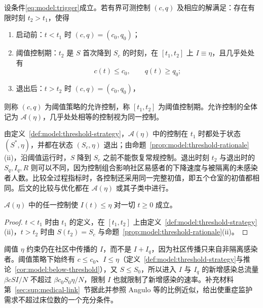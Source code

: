 \begin{definition}[阈值策略]
\label{def:model:threshold-strategy}
设条件\eqref{eq:model:trigger}成立。若有界可测控制 $(c,q)$ 及相应的解满足：存在有限时刻 $t_2>t_1$，使得
\begin{enumerate}
\renewcommand{\labelenumi}{(\roman{enumi})}
\item 启动前：$t<t_1$ 时 $(c,q)=(c_0,q_0)$；
\item 阈值控制期：$t_2$ 是 $S$ 首次降到 $S_c$ 的时刻，在 $[t_1,t_2]$ 上 $I\equiv\eta$，且几乎处处有
\begin{equation}
c(t)\le c_0,\qquad q(t)\ge q_0;
\label{eq:model:plateau-requirement}
\end{equation}
\item 退出后：$t>t_2$ 时 $(c,q)=(c_0,q_0)$，
\end{enumerate}
则称 $(c,q)$ 为阈值策略的允许控制，称 $[t_1,t_2]$ 为阈值控制期。允许控制的全体记为 $\mathcal A(\eta)$，几乎处处相等的控制视为同一控制。
\end{definition}

由定义~\ref{def:model:threshold-strategy}，$\mathcal A(\eta)$ 中的控制在 $t_1$ 时都处于状态 $(S^*,\eta)$，并都在状态 $(S_c,\eta)$ 退出；由命题~\ref{prop:model:threshold-rationale}(ii)，沿阈值运行时，$S$ 降到 $S_c$ 之前不能恢复常规控制。退出时刻 $t_2$ 与退出时的 $S_q,I_q,R$ 则可以不同，因为控制组合影响社区易感者的下降速度与被隔离的未感染者人数。比较全过程指标时，各控制还采用同一完整初值，即五个仓室的初值都相同。后文的比较与优化都在 $\mathcal A(\eta)$ 或其子类中进行。

\begin{corollaryn}
\label{cor:model:below-threshold}
$\mathcal A(\eta)$ 中的任一控制使 $I(t)\le\eta$ 对一切 $t\ge0$ 成立。
\end{corollaryn}
\begin{proof}
$t<t_1$ 时由 $t_1$ 的定义，在 $[t_1,t_2]$ 上由定义~\ref{def:model:threshold-strategy}(ii)，$t>t_2$ 时由 $S(t_2)=S_c$ 与命题~\ref{prop:model:threshold-rationale}(ii)。
\end{proof}

阈值 $\eta$ 约束仍在社区中传播的 $I$，而不是 $I+I_q$，因为社区传播只来自非隔离感染者。阈值策略下始终有 $c\le c_0$、$I\le\eta$（定义~\ref{def:model:threshold-strategy}与推论~\ref{cor:model:below-threshold}），又 $S\le S_0$，所以进入 $I$ 与 $I_q$ 的新增感染总流量 $\beta cSI/N$ 不超过 $\beta c_0S_0\eta/N$，限制 $I$ 也就限制了新增感染的速率。补充材料第~\ref{sec:sup:medical-link}~节据此并参照 Angulo 等的比例近似，给出使重症监护需求不超过床位数的一个充分条件。

